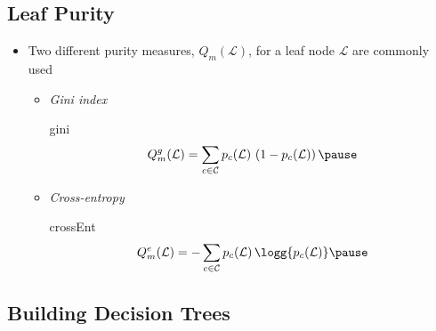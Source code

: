 \begin{slide}
\section[-1]{Leaf Purity}

\begin{PauseHighLight}
  \begin{itemize}
  \item Two different purity measures, $Q_m(\mathcal{L})$, for a leaf node
    $\mathcal{L}$ are commonly used\pause
    \begin{itemize}
    \item \emph{Gini index}
      
      \begin{rightImage}{gini}
        \begin{align*}
          Q^g_m(\mathcal{L}) = \sum_{c\in\mathcal{C}} p_{c}(\mathcal{L})\,
          \left(1-p_{c}(\mathcal{L})\right)\pause
        \end{align*}
      \end{rightImage}
    \item \emph{Cross-entropy}
      
      \begin{rightImage}{crossEnt}
        \begin{align*}
          Q^e_m(\mathcal{L}) = - \sum_{c\in\mathcal{C}} p_{c}(\mathcal{L})\,
          \logg{p_{c}(\mathcal{L})} \pause        
        \end{align*}
      \end{rightImage}
    \end{itemize}
  \end{itemize}
\end{PauseHighLight}

\end{slide}



\begin{slide}
\section[-1]{Building Decision Trees}

\pb\pause{}
\begin{center}
  \pause
\end{center}

\end{slide}


